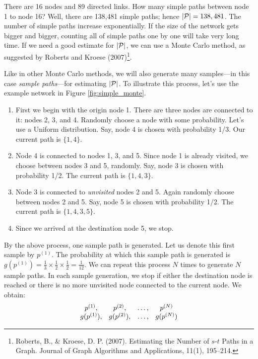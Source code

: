 There are 16 nodes and 89 directed links. How many simple paths between node 1 to node 16? Well, there are 138,481 simple paths; hence $|\mathcal{P}|=138,481$. The number of simple paths increase exponentially. If the size of the network gets bigger and bigger, counting all of simple paths one by one will take very long time. If we need a good estimate for $|\mathcal{P}|$, we can use a Monte Carlo method, as suggested by Roberts and Kroese (2007)\footnote{Roberts, B., \& Kroese, D. P. (2007). Estimating the Number of $s$-$t$ Paths in a Graph. Journal of Graph Algorithms and Applications, 11(1), 195--214.}.

Like in other Monte Carlo methods, we will also generate many samples---in this case \emph{sample paths}---for estimating $|\mathcal{P}|$. To illustrate this process, let's use the example network in Figure \ref{fig:simple_monte}.

\begin{enumerate}
\item First we begin with the origin node 1. There are three nodes are connected to it: nodes 2, 3, and 4. Randomly choose a node with some probability. Let's use a Uniform distribution. Say, node 4 is chosen with probability 1/3. Our current path is $\{1, 4\}$.
\item Node 4 is connected to nodes 1, 3, and 5. Since node 1 is already visited, we choose between nodes 3 and 5, randomly. Say, node 3 is chosen with probability 1/2. The current path is $\{1, 4, 3\}$.
\item Node 3 is connected to \emph{unvisited} nodes 2 and 5. Again randomly choose between nodes 2 and 5. Say, node 5 is chosen with probability 1/2. The current path is $\{1, 4, 3, 5\}$.
\item Since we arrived at the destination node 5, we stop.
\end{enumerate}

By the above process, one sample path is generated. Let us denote this first sample by $p^{(1)}$. The probability at which this sample path is generated is $g(p^{(1)}) = \frac{1}{3} \times \frac{1}{2} \times \frac{1}{2} = \frac{1}{12}$. We can repeat this process $N$ times to generate $N$ sample paths. In each sample generation, we stop if either the destination node is reached or there is no more unvisited node connected to the current node. We obtain:
\[
\begin{array}{c c c c}
p^{(1)},    &  p^{(2)},   & \ldots,  & p^{(N)}     \\
g(p^{(1)}), & g(p^{(2)}), & \ldots, & g(p^{(N)})
\end{array}
\]


